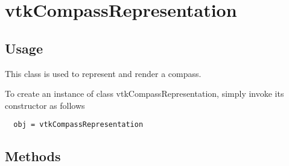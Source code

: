 \section{vtkCompassRepresentation}

\subsection{Usage}

 This class is used to represent and render a compass.  

To create an instance of class vtkCompassRepresentation, simply
invoke its constructor as follows
\begin{verbatim}
  obj = vtkCompassRepresentation
\end{verbatim}
\subsection{Methods}

